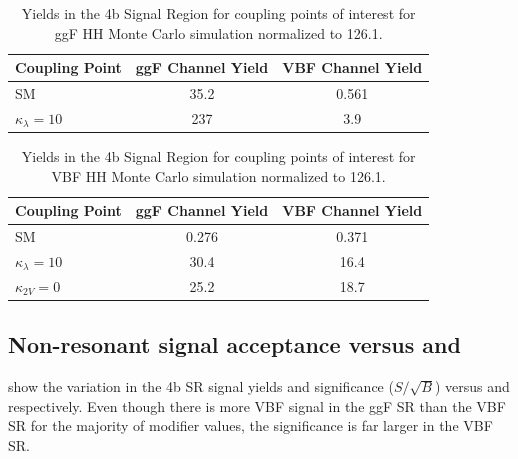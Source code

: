 \begin{table}[h]
    \centering
    \caption{Yields in the 4b Signal Region for coupling points of interest for ggF HH Monte Carlo simulation normalized to 126.1\ifb.}
    \label{tab:ggF_4SR_yields}
    \begin{tabular}{lcc}
        \toprule
        Coupling Point & ggF Channel Yield & VBF Channel Yield \\
        \midrule
        {SM} & {35.2} & {0.561} \\
        {$\kappa_{\lambda} = 10$} & {237} & {3.9} \\
    \bottomrule
    \end{tabular}
\end{table}
      
\begin{table}[h]
    \centering
    \caption{Yields in the 4b Signal Region for coupling points of interest for VBF HH Monte Carlo simulation normalized to 126.1\ifb.}
	\label{tab:VBF_4SR_yields}
    \begin{tabular}{lcc}
        \toprule
        Coupling Point & ggF Channel Yield & VBF Channel Yield \\
        \midrule
        {SM} & {0.276} & {0.371} \\
        {$\kappa_{\lambda} = 10$} & {30.4} & {16.4} \\
        {$\kappa_{2V} = 0$} & {25.2} & {18.7} \\
    \bottomrule
    \end{tabular}
\end{table}

\clearpage

\subsection{Non-resonant signal acceptance versus \kl and \kvv}
\label{Non-resonant-signal-acceptance-versus-kl}
\Figrange{\ref{fig:syield_signif_kl}}{\ref{fig:syield_signif_k2v}} show the variation in the 4b SR signal yields and significance ($S/\sqrt{B}$) versus \kvv and \kl respectively. Even though there is more VBF signal in the ggF SR than the VBF SR for the majority of modifier values, the significance is far larger in the VBF SR.


